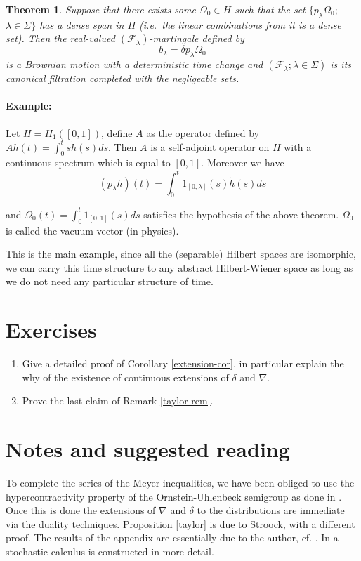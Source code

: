 \documentclass[12pt,a4paper]{book}
\newtheorem{theorem}{Theorem}[section]
\begin{document}
\begin{theorem}
Suppose that there exists some $\Omega_0\in H$ such that  the set
$\{p_\lambda\Omega_0;$ $\lambda\in\Sigma\}$ has a dense span in $H$ (i.e.\ the
linear combinations from it is a dense set). Then the real-valued $({\mathcal
F}_\lambda)$-martingale defined by
$$
b_\lambda=\delta p_\lambda\Omega_0
$$
\noindent
is a Brownian motion with  a deterministic time change and $({\mathcal
F}_\lambda;\lambda\in\Sigma)$ is its canonical filtration completed with the
negligeable sets.
\end{theorem}
\paragraph{Example:}
Let $H=H_1([0,1])$, define $A$ as the operator defined by
$Ah(t)=\int_0^t s\dot{h}(s)ds$. Then $A$ is a self-adjoint operator on
$H$ with a continuous spectrum which is equal to $[0,1]$. Moreover we have
$$
(p_\lambda h)(t)=\int_0^t 1_{[0,\lambda]}(s)\dot{h}(s)ds
$$

\noindent
and $\Omega_0(t)=\int_0^t 1_{[0,1]}(s)ds$ satisfies the hypothesis of
the above theorem. $\Omega_0$ is called the vacuum vector  (in physics).

This is the main example, since all the (separable) Hilbert spaces are
isomorphic, we can carry this time structure to any abstract Hilbert-Wiener
space as long as we do not need any particular structure of time.
\section{Exercises}
{\footnotesize{
\begin{enumerate}
\item Give a detailed proof of Corollary \ref{extension-cor}, in
particular explain the why of the existence of  continuous extensions
of $\delta$ and $\nabla$.
\item Prove the last claim of Remark \ref{taylor-rem}.
\end{enumerate}
}}

\section*{Notes and suggested reading}
{\footnotesize{To complete the series of the Meyer inequalities, we
    have been obliged to use the hypercontractivity property of the
    Ornstein-Uhlenbeck semigroup as done  in \cite{PAM}. Once this is
    done the extensions of $\nabla$ and $\delta$ to the distributions
    are immediate via the duality techniques. Proposition \ref{taylor}
    is due to Stroock, \cite{DS} with a different proof. The results
    of the appendix are essentially due to the author, cf. \cite{U5}.
    In \cite{UZ7} a stochastic calculus is constructed in more detail.


}}
\end{document}
